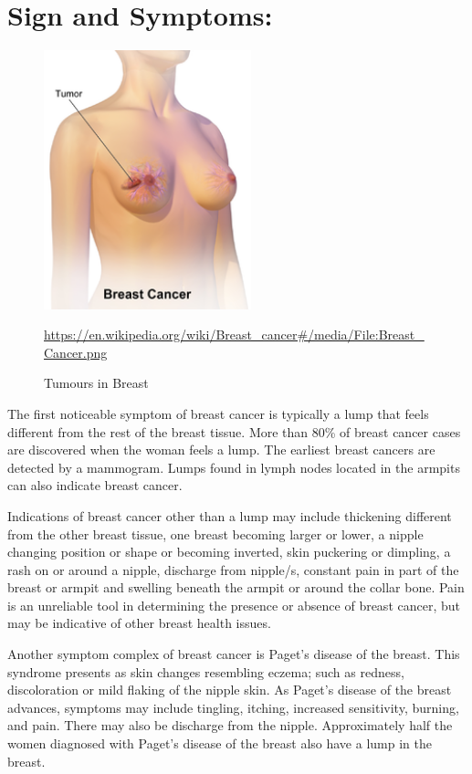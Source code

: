 \documentclass{report}
\begin{document}
\section{Sign and Symptoms:}
\begin{figure}[ht!]
\centering
\includegraphics[width=60mm]{p2.png}
\caption{Tumours in Breast\label{overflow}}
{\url{https://en.wikipedia.org/wiki/Breast_cancer#/media/File:Breast_Cancer.png}}
\end{figure}

The first noticeable symptom of breast cancer is typically a lump that feels different from the rest of the breast tissue. More than 80\% of breast cancer cases are discovered when the woman feels a lump. The earliest breast cancers are detected by a mammogram. Lumps found in lymph nodes located in the armpits can also indicate breast cancer.

Indications of breast cancer other than a lump may include thickening different from the other breast tissue, one breast becoming larger or lower, a nipple changing position or shape or becoming inverted, skin puckering or dimpling, a rash on or around a nipple, discharge from nipple/s, constant pain in part of the breast or armpit and swelling beneath the armpit or around the collar bone. Pain is an unreliable tool in determining the presence or absence of breast cancer, but may be indicative of other breast health issues.

Another symptom complex of breast cancer is Paget's disease of the breast. This syndrome presents as skin changes resembling eczema; such as redness, discoloration or mild flaking of the nipple skin. As Paget's disease of the breast advances, symptoms may include tingling, itching, increased sensitivity, burning, and pain. There may also be discharge from the nipple. Approximately half the women diagnosed with Paget's disease of the breast also have a lump in the breast.
\end{document}
